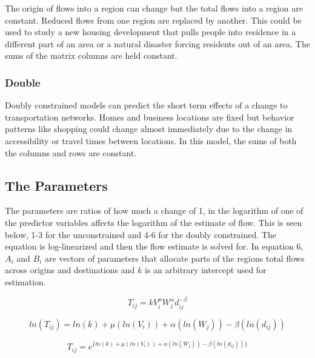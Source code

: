 \documentclass[11pt]{article} %
\begin{document}
The origin of flows into a region can change but the total flows into a region are constant. Reduced flows from one region are replaced by another.  This could be used to study a new housing development that pulls people into residence in a different part of an area or a natural disaster forcing residents out of an area.  The sums of the matrix columns are held constant.

\subsubsection{Double}

Doubly constrained models can predict the short term effects of a change to transportation networks. Homes and business locations are fixed but behavior patterns like shopping could change almost immediately due to the change in accessibility or travel times between locations. In this model, the sums of both the columns and rows are constant.

\subsection{The Parameters}

The parameters are ratios of how much a change of 1, in the logarithm of one of the predictor variables affects the logarithm of the estimate of flow. This is seen below, 1-3 for the unconstrained and 4-6 for the doubly constrained. The equation is log-linearized and then the flow estimate is solved for. In equation 6, $A_i$ and $B_i$ are vectors of parameters that allocate parts of the regions total flows across origins and destinations and $k$ is an arbitrary intercept used for estimation. 

\begin{equation}
T_{ij} = k V_i ^{\mu} W_j^{\alpha} d_{ij}^{-\beta}
\end{equation}

\begin{equation}
ln(T_{ij}) = ln(k) + \mu (ln(V_i)) +  \alpha( ln(W_j)) - \beta (ln(d_{ij}))
\end{equation}




\begin{equation}
T_{ij} = e^ { \{ ln(k) + \mu (ln(V_i)) +  \alpha( ln(W_j)) - \beta (ln(d_{ij})) \}}
\end{equation}
\end{document}
